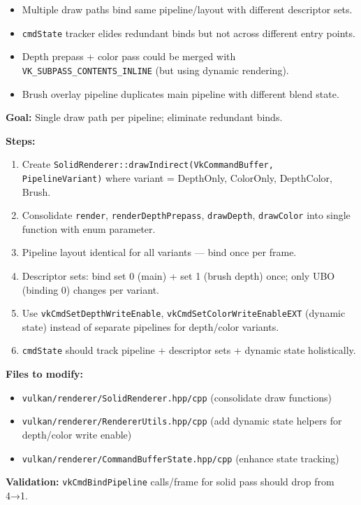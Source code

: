 \documentclass[11pt,a4paper]{article}
\begin{document}
\begin{itemize}
    \item Multiple draw paths bind same pipeline/layout with different descriptor sets.
    \item \texttt{cmdState} tracker elides redundant binds but not across different entry points.
    \item Depth prepass + color pass could be merged with \texttt{VK\_SUBPASS\_CONTENTS\_INLINE} (but using dynamic rendering).
    \item Brush overlay pipeline duplicates main pipeline with different blend state.
\end{itemize}

\begin{tcolorbox}[promptbox={Prompt: Unify Draw Entry Points + Pipeline State Cache}]
\textbf{Goal:} Single draw path per pipeline; eliminate redundant binds.

\textbf{Steps:}
\begin{enumerate}
    \item Create \texttt{SolidRenderer::drawIndirect(VkCommandBuffer, PipelineVariant)} where variant = {DepthOnly, ColorOnly, DepthColor, Brush}.
    \item Consolidate \texttt{render}, \texttt{renderDepthPrepass}, \texttt{drawDepth}, \texttt{drawColor} into single function with enum parameter.
    \item Pipeline layout identical for all variants — bind once per frame.
    \item Descriptor sets: bind set 0 (main) + set 1 (brush depth) once; only UBO (binding 0) changes per variant.
    \item Use \texttt{vkCmdSetDepthWriteEnable}, \texttt{vkCmdSetColorWriteEnableEXT} (dynamic state) instead of separate pipelines for depth/color variants.
    \item \texttt{cmdState} should track pipeline + descriptor sets + dynamic state holistically.
\end{enumerate}

\textbf{Files to modify:}
\begin{itemize}
    \item \texttt{vulkan/renderer/SolidRenderer.hpp/cpp} (consolidate draw functions)
    \item \texttt{vulkan/renderer/RendererUtils.hpp/cpp} (add dynamic state helpers for depth/color write enable)
    \item \texttt{vulkan/renderer/CommandBufferState.hpp/cpp} (enhance state tracking)
\end{itemize}

\textbf{Validation:} \texttt{vkCmdBindPipeline} calls/frame for solid pass should drop from 4→1.
\end{tcolorbox}
\end{document}
